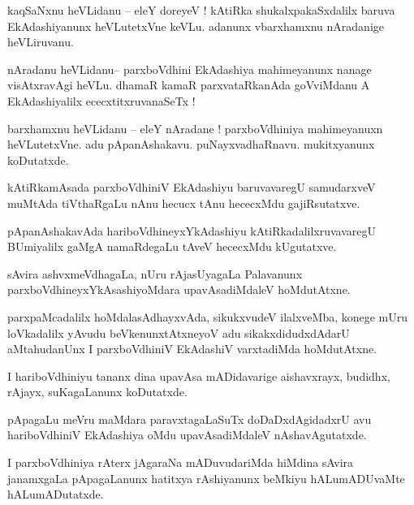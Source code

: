 \documentclass{article}
\begin{document}
\begin{mn}%
kaqSaNxnu heVLidanu -- eleY doreyeV ! kAtiRka shukalxpakaSxdalilx baruva EkAdashiyanunx 
heVLutetxVne keVLu. adanunx vbarxhamxnu nAradanige heVLiruvanu.
\end{mn}

\begin{mn}%
nAradanu heVLidanu-- parxboVdhini EkAdashiya mahimeyanunx nanage visAtxravAgi heVLu. dhamaR kamaR 
parxvataRkanAda goVviMdanu A EkAdashiyalilx ececxtitxruvanaSeTx !
\end{mn}

\begin{mn}%
barxhamxnu heVLidanu -- eleY nAradane ! parxboVdhiniya mahimeyanuxn heVLutetxVne. adu 
pApanAshakavu. puNayxvadhaRnavu. mukitxyanunx koDutatxde.
\end{mn}

\begin{mn}%
kAtiRkamAsada parxboVdhiniV EkAdashiyu baruvavaregU samudarxveV muMtAda tiVthaRgaLu nAnu hecucx 
tAnu hececxMdu gajiRsutatxve.
\end{mn}

\begin{mn}%
pApanAshakavAda hariboVdhineyxYkAdashiyu kAtiRkadalilxruvavaregU BUmiyalilx gaMgA namaRdegaLu tAveV 
hececxMdu kUgutatxve.
\end{mn}

\begin{mn}%
sAvira ashvxmeVdhagaLa, nUru rAjasUyagaLa Palavanunx parxboVdhineyxYkAsashiyoMdara upavAsadiMdaleV 
hoMdutAtxne.
\end{mn}

\begin{mn}%
parxpaMcadalilx hoMdalasAdhayxvAda, sikukxvudeV ilalxveMba, konege mUru loVkadalilx yAvudu 
beVkenunxtAtxneyoV adu sikakxdidudxdAdarU aMtahudanUnx I parxboVdhiniV EkAdashiV varxtadiMda 
hoMdutAtxne.
\end{mn}

\begin{mn}%
I hariboVdhiniyu tananx dina upavAsa mADidavarige aishavxrayx, budidhx, rAjayx, suKagaLanunx 
koDutatxde.
\end{mn}

\begin{mn}%
pApagaLu meVru maMdara paravxtagaLaSuTx doDaDxdAgidadxrU avu hariboVdhiniV EkAdashiya oMdu 
upavAsadiMdaleV nAshavAgutatxde.
\end{mn}

\begin{mn}%
I parxboVdhiniya rAterx jAgaraNa mADuvudariMda hiMdina sAvira janamxgaLa pApagaLanunx hatitxya 
rAshiyanunx beMkiyu hALumADUvaMte hALumADutatxde.
\end{mn}
\end{document}

